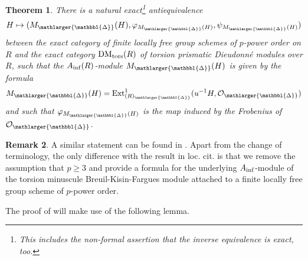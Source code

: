\documentclass{amsart}
\newcommand{\prism}{{\mathlarger{\mathbbl{\Delta}}}}
\theoremstyle{plain}
\newtheorem{theorem}{Theorem}[subsection]
\theoremstyle{definition}
\newtheorem{remark}[theorem]{Remark}
\newcommand{\Q}{\mathbb{Q}}
\newcommand{\Z}{\mathbb{Z}}
\newcommand{\green}[1]{{\color{black}#1}}
\newcommand{\blue}[1]{{\color{black}#1}}
\begin{document}
\begin{theorem}
  \label{theorem-exact-antiequivalence-for-finite-flat-group-schemes}
There is a natural exact\footnote{This includes the non-formal assertion that the inverse equivalence is exact, too.} antiequivalence
\[ H \mapsto (M_{\prism}(H), \varphi_{M_{\prism}(H)}, \psi_{M_{\prism}(H)}) \]
between the \blue{exact} category of finite locally free group schemes of $p$-power order on $R$ and the \blue{exact} category $\mathrm{DM}_{\rm tors}(R)$ of torsion prismatic Dieudonn\'e modules over $R$, such that the $A_{\rm inf}(R)$-module $M_{\prism}(H)$ is given by the formula 
\[ M_{\prism}(H)=\mathrm{Ext}_{(R)_{\prism}}^1(u^{-1} H, \mathcal{O}_{\prism}) \]
and such that $\varphi_{M_{\prism}(H)}$ is the map induced by the Frobenius of $\mathcal{O}_{\prism}$. 

\end{theorem}


\begin{remark}
  \label{remark-previous-results-on-classification-of-finite-flat-group-schemes}
A similar statement can be found in \cite[Theorem 10.12]{lau_dieudonne_theory_over_semiperfect_rings_and_perfectoid_rings}. Apart from the change of terminology, the only difference with the result in loc. cit. is that we remove the assumption that $p\geq 3$ and provide a formula for the underlying $A_{\rm inf}$-module of the torsion minuscule Breuil-Kisin-Fargues module attached to a finite locally free group scheme of $p$-power order.
\end{remark}

The proof of  will make use of the following lemma.
\end{document}
